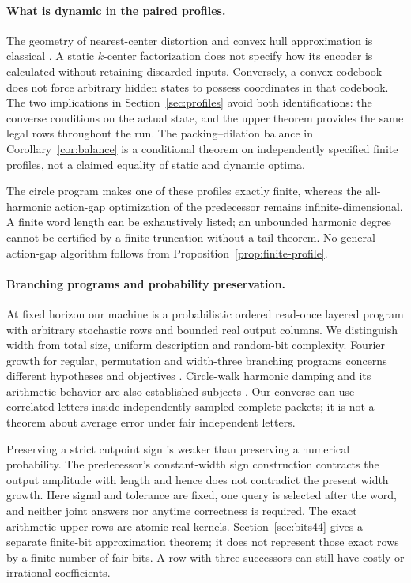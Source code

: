 \paragraph{What is dynamic in the paired profiles.}
The geometry of nearest-center distortion and convex hull approximation is classical \cite{GL,Vidyasagar}. A static $k$-center factorization does not specify how its encoder is calculated without retaining discarded inputs. Conversely, a convex codebook does not force arbitrary hidden states to possess coordinates in that codebook. The two implications in Section~\ref{sec:profiles} avoid both identifications: the converse conditions on the actual state, and the upper theorem provides the same legal rows throughout the run. The packing--dilation balance in Corollary~\ref{cor:balance} is a conditional theorem on independently specified finite profiles, not a claimed equality of static and dynamic optima.

The circle program makes one of these profiles exactly finite, whereas the all-harmonic action-gap optimization of the predecessor remains infinite-dimensional. A finite word length can be exhaustively listed; an unbounded harmonic degree cannot be certified by a finite truncation without a tail theorem. No general action-gap algorithm follows from Proposition~\ref{prop:finite-profile}.

\paragraph{Branching programs and probability preservation.}
At fixed horizon our machine is a probabilistic ordered read-once layered program with arbitrary stochastic rows and bounded real output columns. We distinguish width from total size, uniform description and random-bit complexity. Fourier growth for regular, permutation and width-three branching programs concerns different hypotheses and objectives \cite{RSV,SVW,LPV}. Circle-walk harmonic damping and its arithmetic behavior are also established subjects \cite{BB}. Our converse can use correlated letters inside independently sampled complete packets; it is not a theorem about average error under fair independent letters.

Preserving a strict cutpoint sign is weaker than preserving a numerical probability. The predecessor's constant-width sign construction contracts the output amplitude with length and hence does not contradict the present width growth. Here signal and tolerance are fixed, one query is selected after the word, and neither joint answers nor anytime correctness is required. The exact arithmetic upper rows are atomic real kernels. Section~\ref{sec:bits44} gives a separate finite-bit approximation theorem; it does not represent those exact rows by a finite number of fair bits. A row with three successors can still have costly or irrational coefficients.

